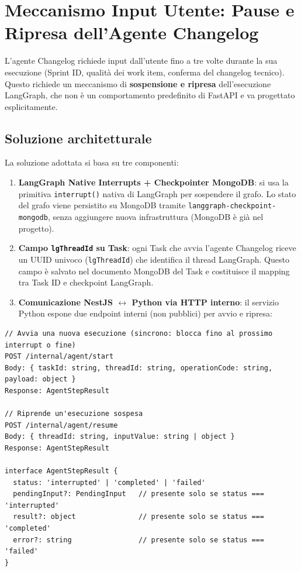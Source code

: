 \documentclass[11pt,a4paper]{article}
\begin{document}
\section{Meccanismo Input Utente: Pause e Ripresa dell'Agente Changelog}
\label{sec:be-input-utente}

L'agente Changelog richiede input dall'utente fino a tre volte durante la sua esecuzione (Sprint ID, qualità dei work item, conferma del changelog tecnico). Questo richiede un meccanismo di \textbf{sospensione e ripresa} dell'esecuzione LangGraph, che non è un comportamento predefinito di FastAPI e va progettato esplicitamente.

\subsection{Soluzione architetturale}

La soluzione adottata si basa su tre componenti:

\begin{enumerate}
    \item \textbf{LangGraph Native Interrupts + Checkpointer MongoDB}: si usa la primitiva \texttt{interrupt()} nativa di LangGraph per sospendere il grafo. Lo stato del grafo viene persistito su MongoDB tramite \texttt{langgraph-checkpoint-mongodb}, senza aggiungere nuova infrastruttura (MongoDB è già nel progetto).
    \item \textbf{Campo \texttt{lgThreadId} su Task}: ogni Task che avvia l'agente Changelog riceve un UUID univoco (\texttt{lgThreadId}) che identifica il thread LangGraph. Questo campo è salvato nel documento MongoDB del Task e costituisce il mapping tra Task ID e checkpoint LangGraph.
    \item \textbf{Comunicazione NestJS $\leftrightarrow$ Python via HTTP interno}: il servizio Python espone due endpoint interni (non pubblici) per avvio e ripresa:
\end{enumerate}

\begin{lstlisting}[caption={Endpoint HTTP interni del Python agent service per il meccanismo pause/resume. Non sono esposti pubblicamente; il frontend non li conosce.}]
// Avvia una nuova esecuzione (sincrono: blocca fino al prossimo interrupt o fine)
POST /internal/agent/start
Body: { taskId: string, threadId: string, operationCode: string, payload: object }
Response: AgentStepResult

// Riprende un'esecuzione sospesa
POST /internal/agent/resume
Body: { threadId: string, inputValue: string | object }
Response: AgentStepResult

interface AgentStepResult {
  status: 'interrupted' | 'completed' | 'failed'
  pendingInput?: PendingInput   // presente solo se status === 'interrupted'
  result?: object               // presente solo se status === 'completed'
  error?: string                // presente solo se status === 'failed'
}
\end{lstlisting}
\end{document}
